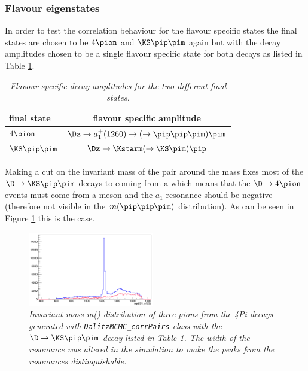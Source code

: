 \subsubsection{Flavour eigenstates}
In order to test the correlation behaviour for the flavour specific states the \D final states are chosen to be $4\pion$ and $\KS \pip \pim$ again but with the decay amplitudes chosen to be a single flavour specific state for both decays as listed in Table \ref{tab:corr2}.\\
\begin{table}[!h]
\begin{center}
\begin{tabular}{l|c}
final state & flavour specific amplitude   \\
\hline
$4 \pion$ & $\Dz \rightarrow a_1^+(1260)\rightarrow (\rightarrow \pip \pip \pim) \pim $ \\
\hline
$\KS \pip \pim$ & $\Dz \rightarrow \Kstarm(\rightarrow \KS \pim) \pip $   \\
\end{tabular}
\end{center}
\vspace*{-0.5cm}
\caption{\textit{Flavour specific decay amplitudes for the two different final states.}}
\label{tab:corr2}
\end{table}
Making a cut on the invariant mass of the \KS \pim pair around the \Kstarm mass fixes most of the $\D \rightarrow \KS \pip \pim$ decays to coming from a \Dz which means that the $\D \rightarrow 4 \pion$ events must come from a \Dzb meson and the $a_1$ resonance should be negative (therefore not visible in the $m(\pip \pip \pim)$ distribution). As can be seen in Figure \ref{fig:corr2} this is the case.\\

\begin{figure}[!h]
\vspace*{-0.cm}
  \begin{center}
 \includegraphics[width=0.49\textwidth]{a1peak.png}
  \vspace*{-0.5cm}
  \end{center}
  \caption{\textit{Invariant mass m(\pip \pip \pim) distribution of three pions from the \DTo4Pi decays generated with \mint \texttt{DalitzMCMC\_corrPairs} class with  the $\D \rightarrow \KS \pip \pim$ decay listed in Table \ref{tab:corr2}. The width of the resonance was altered in the simulation to make the peaks from the resonances distinguishable.}}
  \label{fig:corr2}
\end{figure}

